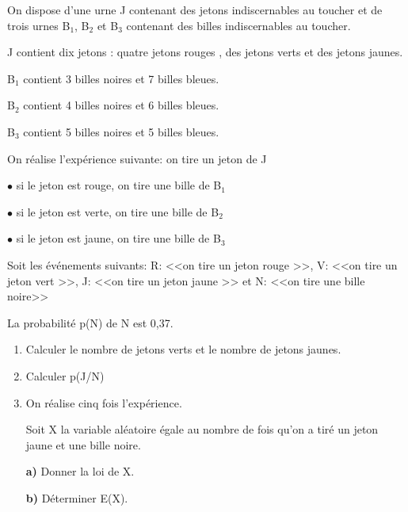 \begin{exercice}
On dispose d'une urne J contenant des jetons indiscernables au toucher et de trois urnes B$ _1 $, B$ _2 $  et B$ _3 $ contenant des billes indiscernables au toucher.

J contient dix jetons : quatre jetons rouges , des jetons verts et des jetons jaunes.

B$ _1 $  contient 3 billes noires et 7 billes bleues.

B$ _2 $  contient 4 billes noires et 6 billes bleues.

B$ _3 $  contient 5 billes noires et 5 billes bleues.

On réalise l'expérience suivante: on tire un jeton de J

$ \bullet $ si le jeton est rouge, on tire une bille de  B$ _1 $ 

$ \bullet $ si le jeton est verte, on tire une bille de  B$ _2 $

$ \bullet $ si le jeton est jaune, on tire une bille de  B$ _3 $


Soit les événements suivants: R: <<on tire un jeton rouge >>, V: <<on tire un jeton vert >>, J: <<on tire un jeton jaune >> et N: <<on tire une bille noire>>


La probabilité  p(N)  de N est 0,37.
\begin{enumerate}
\item Calculer le nombre de jetons verts et le nombre  de jetons jaunes.
\item Calculer p(J/N)
\item On réalise cinq fois l'expérience.

Soit X la variable aléatoire égale au nombre de fois qu'on a tiré un jeton jaune et une bille noire.

\textbf{a)}  Donner la loi de X.

\textbf{b)} Déterminer E(X).
\end{enumerate}

\end{exercice}
